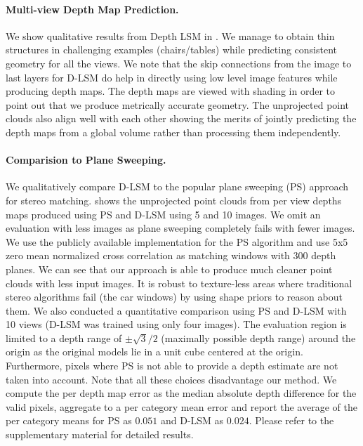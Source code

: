 \documentclass[../thesis.tex]{subfiles}
\begin{document}
\paragraph{Multi-view Depth Map Prediction.}
We show qualitative results from Depth LSM in . We manage to obtain thin structures in challenging examples (chairs/tables) while predicting consistent geometry for all the views. We note that the skip connections from the image to last layers for D-LSM do help in directly using low level image features while producing depth maps. The depth maps are viewed with shading in order to point out that we produce metrically accurate geometry. The unprojected point clouds also align well with each other showing the merits of jointly predicting the depth maps from a global volume rather than processing them independently.

\paragraph{Comparision to Plane Sweeping.}
We qualitatively compare D-LSM to the popular plane sweeping (PS) approach \cite{collins1996space,yang2003real} for stereo matching.  shows the unprojected point clouds from per view depths maps produced using PS and D-LSM using 5 and 10 images. We omit an evaluation with less images as plane sweeping completely fails with fewer images. We use the publicly available implementation for the PS algorithm \cite{hane2014real} and use 5x5 zero mean normalized cross correlation as matching windows with 300 depth planes. We can see that our approach is able to produce much cleaner point clouds with less input images. It is robust to texture-less areas where traditional stereo algorithms fail (\eg the car windows) by using shape priors to reason about them. We also conducted a quantitative comparison using PS and D-LSM with 10 views (D-LSM was trained using only four images). The evaluation region is limited to a depth range of $\pm \sqrt{3}/2$ (maximally possible depth range) around the origin as the original models lie in a unit cube centered at the origin. Furthermore, pixels where PS is not able to provide a depth estimate are not taken into account. Note that all these choices disadvantage our method. We compute the per depth map error as the median absolute depth difference for the valid pixels, aggregate to a per category mean error and report the average of the per category means for PS as $0.051$ and D-LSM as $0.024$. Please refer to the supplementary material for detailed results.
\end{document}
